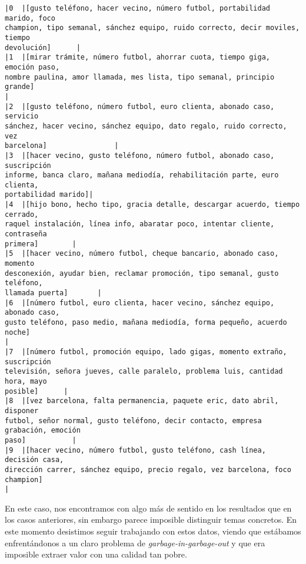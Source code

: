     \begin{Verbatim}[commandchars=\\\{\}]
|0  |[gusto teléfono, hacer vecino, número futbol, portabilidad marido, foco
champion, tipo semanal, sánchez equipo, ruido correcto, decir moviles, tiempo
devolución]      |
|1  |[mirar trámite, número futbol, ahorrar cuota, tiempo giga, emoción paso,
nombre paulina, amor llamada, mes lista, tipo semanal, principio grande]
|
|2  |[gusto teléfono, número futbol, euro clienta, abonado caso, servicio
sánchez, hacer vecino, sánchez equipo, dato regalo, ruido correcto, vez
barcelona]                |
|3  |[hacer vecino, gusto teléfono, número futbol, abonado caso, suscripción
informe, banca claro, mañana mediodía, rehabilitación parte, euro clienta,
portabilidad marido]|
|4  |[hijo bono, hecho tipo, gracia detalle, descargar acuerdo, tiempo cerrado,
raquel instalación, línea info, abaratar poco, intentar cliente, contraseña
primera]        |
|5  |[hacer vecino, número futbol, cheque bancario, abonado caso, momento
desconexión, ayudar bien, reclamar promoción, tipo semanal, gusto teléfono,
llamada puerta]       |
|6  |[número futbol, euro clienta, hacer vecino, sánchez equipo, abonado caso,
gusto teléfono, paso medio, mañana mediodía, forma pequeño, acuerdo noche]
|
|7  |[número futbol, promoción equipo, lado gigas, momento extraño, suscripción
televisión, señora jueves, calle paralelo, problema luis, cantidad hora, mayo
posible]      |
|8  |[vez barcelona, falta permanencia, paquete eric, dato abril, disponer
futbol, señor normal, gusto teléfono, decir contacto, empresa grabación, emoción
paso]           |
|9  |[hacer vecino, número futbol, gusto teléfono, cash línea, decisión casa,
dirección carrer, sánchez equipo, precio regalo, vez barcelona, foco champion]
|

    \end{Verbatim}

En este caso, nos encontramos con algo más de sentido en los resultados que en los casos anteriores, sin embargo parece imposible distinguir temas concretos. En este momento desistimos seguir trabajando con estos datos, viendo que estábamos enfrentándonos a un claro problema de \textit{garbage-in-garbage-out} y que era imposible extraer valor con una calidad tan pobre.




